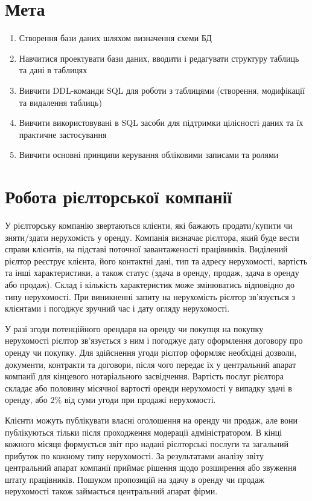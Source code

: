 \section{Мета}

\begin{enumerate}
	\item Створення бази даних шляхом визначення схеми БД
	\item Навчитися проектувати бази даних, вводити і редагувати структуру таблиць та дані в таблицях
	\item Вивчити DDL-команди SQL для роботи з таблицями (створення, модифікації та видалення таблиць)
	\item Вивчити використовувані в SQL засоби для підтримки цілісності даних та їх практичне застосування
	\item Вивчити основні принципи керування обліковими записами та ролями
\end{enumerate}

\section{Робота рієлторської компанії}

У рієлторську компанію звертаються клієнти, які бажають продати/купити чи зняти/здати нерухомість
у оренду. Компанія визначає рієлтора, який буде вести справи клієнтів, на підставі поточної
завантаженості працівників. Виділений рієлтор реєструє клієнта, його контактні дані, тип та
адресу нерухомості, вартість та інші характеристики, а також статус (здача в оренду, продаж,
здача в оренду або продаж). Склад і кількість характеристик може змінюватись відповідно до типу
нерухомості. При виникненні запиту на нерухомість рієлтор зв'язується з клієнтами і погоджує
зручний час і дату огляду нерухомості.

У разі згоди потенційного орендаря на оренду чи покупця на покупку нерухомості рієлтор зв'язується
з ним і погоджує дату оформлення договору про оренду чи покупку. Для здійснення угоди рієлтор оформляє
необхідні дозволи, документи, контракти та договори, після чого передає їх у центральний апарат
компанії для кінцевого нотаріального засвідчення. Вартість послуг рієлтора складає або половину
місячної вартості оренди нерухомості у випадку здачі в оренду, або 2\% від суми угоди при продажі нерухомості.

Клієнти можуть публікувати власні оголошення на оренду чи продаж, але вони публікуються тільки після
проходження модерації адміністратором. В кінці кожного місяця формується звіт про надані рієлторські
послуги та загальний прибуток по кожному типу нерухомості. За результатами аналізу звіту центральний
апарат компанії приймає рішення щодо розширення або звуження штату працівників. Пошуком пропозицій
на здачу в оренду чи продаж нерухомості також займається центральний апарат фірми.

